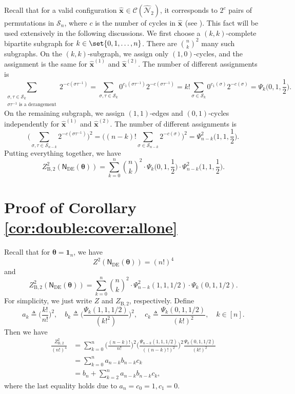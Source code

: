 \documentclass[conference]{IEEEtran}
\theoremstyle{plain}
\theoremstyle{definition}
\newcommand{\B}{\mathrm{B}}
\newcommand{\sfn}{\mathsf{N}}
\newcommand{\hatbfx}[1][]{\widehat{\mathbf{x}}^{ #1 }}
\newcommand{\btheta}{\boldsymbol{\theta}}
\newcommand{\defeq}{\triangleq}
\newcommand{\sfnDE}{\sfn_{\mathrm{DE}}}
\newcommand{\validc}{\mathcal {C}(\widehat{\mathcal N}_2)}
\begin{document}
 Recall that for a valid configuration $\hatbfx\in \validc$, it corresponds to
 $2^c$ pairs of permutations in $\mathcal{S}_n$, where $c$ is the number of
 cycles in $\hatbfx$ (see \cite{ngDoublecoverbasedAnalysisBethe2022}). This
 fact will be used extensively in the following discussions. We first choose a
 $(k,k)$-complete bipartite subgraph for $k\in\set{0,1,\dots,n}$. There are
 $\binom{n}{k}^2$ many such subgraphs. On the $(k,k)$-subgraph, we assign only
 $(1,0)$-cycles, and the assignment is the same for $\hatbfx[(1)]$ and
 $\hatbfx[(2)]$. The number of different assignments is
 \[
  \sum_{\substack{\sigma,\tau\in \mathcal{S}_k\\\sigma\tau^{-1} \text{ is a derangement}}}2^{-c(\sigma\tau^{-1})}
  =\sum_{\sigma,\tau\in \mathcal{S}_k}0^{c_1(\sigma\tau^{-1})}2^{-c(\sigma\tau^{-1})}
  =k!\sum_{\sigma\in \mathcal{S}_k}0^{c_1(\sigma)}2^{-c(\sigma)}
  =\Psi_k\Big(0,1,\frac{1}{2}\Big).
 \]
 On the remaining subgraph, we assign $(1,1)$-edges and $(0,1)$-cycles
 independently for $\hatbfx[(1)]$ and $\hatbfx[(2)]$. The number of different
 assignments is
 \[
  \Big(\sum_{\sigma,\tau\in \mathcal{S}_{n-k}}2^{-c(\sigma\tau^{-1})}\Big)^{\! 2}
  =\Big((n-k)!\sum_{\sigma\in \mathcal{S}_{n-k}}2^{-c(\sigma)}\Big)^{\! 2}
  =\Psi^2_{n-k}\Big(1,1,\frac{1}{2}\Big).
 \]
 Putting everything together, we have
 \[
  Z_{\B,2}^2(\sfnDE(\btheta)) = \sum_{k=0}^{n} \binom{n}{k}^{\!\! 2} \cdot \Psi_{k}\Big(0,1,\frac{1}{2}\Big)  \cdot  \Psi_{n-k}^2\Big(1,1,\frac{1}{2}\Big).
 \]

 \section{Proof of Corollary \ref{cor:double:cover:allone}}\label{appx:double:cover:allone:asym}
 Recall that for $\btheta=\mathbf 1_n$, we have
 \[
  Z^2(\sfnDE(\btheta))=(n!)^4
 \]
 and
 \[
  Z_{\B,2}^2(\sfnDE(\btheta)) = \sum_{k=0}^{n} \binom{n}{k}^{\!\! 2}  \cdot  \Psi_{n-k}^2(1,1,1/2) \cdot \Psi_{k}(0,1,1/2).
 \]
 For simplicity, we just write $Z$ and $Z_{\B,2}$, respectively. Define
 \[
  a_k\defeq\Big(\frac{k!}{n!}\Big)^{\! 2}, \quad
  b_k\defeq\Big(\frac{\Psi_{k}(1,1,1/2)}{(k!^2)}\Big)^{\! 2}, \quad
  c_k\defeq\frac{\Psi_{k}(0,1,1/2)}{(k!)^2}, \quad
  k\in[n].
 \] Then we have
 \begin{align*}
  \frac{Z_{\mathrm B,2}^2}{(n!)^4} &
  =\sum_{k=0}^n \Big(\frac{(n-k)!}{n!}\Big)^{\! 2}
  \Big(\frac{\Psi_{n-k}(1,1,1/2)}{((n-k)!)^2}\Big)^{\! 2}
  \frac{\Psi_{k}(0,1,1/2)}{(k!)^2}                                          \\
                                   & = \sum_{k=0}^n a_{n-k}b_{n-k}c_k       \\
                                   & = b_n+\sum_{k=2}^{n}a_{n-k}b_{n-k}c_k,
 \end{align*}
 where the last equality holds due to $a_n=c_0=1,c_1=0$.
\end{document}
